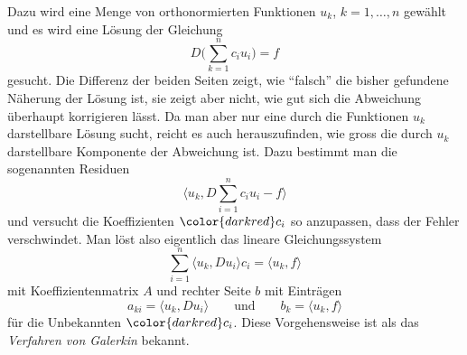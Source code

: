 Dazu wird eine Menge von orthonormierten Funktionen $u_k$,
$k=1,\dots,n$ gewählt und es wird eine Lösung der Gleichung
\[
D\biggl(\sum_{k=1}^n c_i u_i\biggr) = f
\]
gesucht.
Die Differenz der beiden Seiten zeigt, wie ``falsch'' die bisher
gefundene Näherung der Lösung ist, sie zeigt aber nicht, wie gut
sich die Abweichung überhaupt korrigieren lässt.
Da man aber nur eine durch die Funktionen $u_k$ darstellbare
Lösung sucht, reicht es auch herauszufinden, wie gross die durch
$u_k$ darstellbare Komponente der Abweichung ist.
Dazu bestimmt man die sogenannten Residuen
\[
\biggl\langle
u_k,
D
\sum_{i=1}^n c_iu_i
-f
\biggr\rangle
\]
und versucht die Koeffizienten ${\color{darkred}c_i}$ so anzupassen,
dass der Fehler verschwindet.
Man löst also eigentlich das lineare Gleichungssystem
\[
\sum_{i=1}^n
\langle u_k,Du_i\rangle
c_i
=
\langle u_k,f\rangle
\]
mit Koeffizientenmatrix $A$ und rechter Seite $b$ mit Einträgen
\[
a_{ki}
=
\langle u_k,Du_i\rangle
\qquad\text{und}\qquad
b_k
=
\langle u_k,f\rangle
\]
für die Unbekannten ${\color{darkred}c_i}$.
Diese Vorgehensweise ist als das {\em Verfahren von Galerkin} bekannt.
%
%
